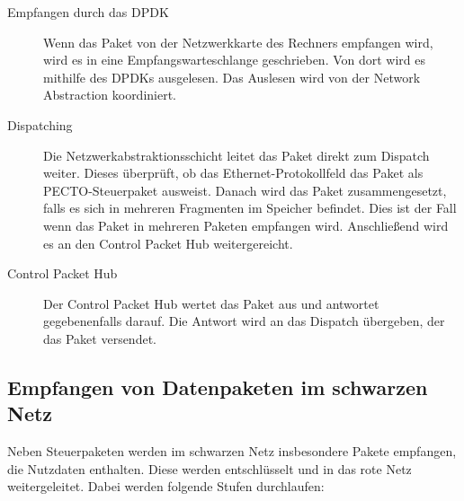 \documentclass[a4paper, 11pt, ngerman, fleqn]{article}
\begin{document}
\begin{description}
\item[Empfangen durch das DPDK]
Wenn das Paket von der Netzwerkkarte des Rechners empfangen wird, wird es in eine Empfangswarteschlange geschrieben. 
Von dort wird es mithilfe des DPDKs ausgelesen.
Das Auslesen wird von der Network Abstraction koordiniert.

\item[Dispatching]
Die Netzwerkabstraktionsschicht leitet das Paket direkt zum Dispatch weiter. 
Dieses überprüft, ob das Ethernet-Protokollfeld das Paket als PECTO-Steuerpaket ausweist.
Danach wird das Paket zusammengesetzt, falls es sich in mehreren Fragmenten im Speicher befindet. 
Dies ist der Fall wenn das Paket in mehreren Paketen empfangen wird.
Anschließend wird es an den Control Packet Hub weitergereicht.

\item[Control Packet Hub]
Der Control Packet Hub wertet das Paket aus und antwortet gegebenenfalls darauf.
Die Antwort wird an das Dispatch übergeben, der das Paket versendet. 
\end{description}

\subsection{Empfangen von Datenpaketen im schwarzen Netz}

Neben Steuerpaketen werden im schwarzen Netz insbesondere Pakete empfangen, die Nutzdaten enthalten. 
Diese werden entschlüsselt und in das rote Netz weitergeleitet.
Dabei werden folgende Stufen durchlaufen:
\end{document}
